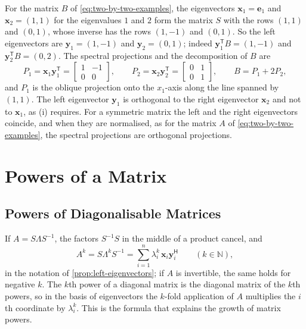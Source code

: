 For the matrix $B$ of \eqref{eq:two-by-two-examples}, the eigenvectors $\mathbf x_1=\mathbf e_1$ and $\mathbf x_2=(1,1)$ for the eigenvalues $1$ and $2$ form the matrix $S$ with the rows $(1,1)$ and $(0,1)$, whose inverse has the rows $(1,-1)$ and $(0,1)$. So the left eigenvectors are $\mathbf y_1=(1,-1)$ and $\mathbf y_2=(0,1)$; indeed $\mathbf y_1^{\mathsf T}B=(1,-1)$ and $\mathbf y_2^{\mathsf T}B=(0,2)$. The spectral projections and the decomposition of $B$ are
\[
P_1=\mathbf x_1\mathbf y_1^{\mathsf T}=\begin{bmatrix}1&-1\\0&0\end{bmatrix},\qquad P_2=\mathbf x_2\mathbf y_2^{\mathsf T}=\begin{bmatrix}0&1\\0&1\end{bmatrix},\qquad B=P_1+2P_2 ,
\]
and $P_1$ is the oblique projection onto the $x_1$-axis along the line spanned by $(1,1)$. The left eigenvector $\mathbf y_1$ is orthogonal to the right eigenvector $\mathbf x_2$ and not to $\mathbf x_1$, as (i) requires. For a symmetric matrix the left and the right eigenvectors coincide, and when they are normalised, as for the matrix $A$ of \eqref{eq:two-by-two-examples}, the spectral projections are orthogonal projections.

\section{Powers of a Matrix}
\label{sec:matrix-powers}

\subsection{Powers of Diagonalisable Matrices}

If $A=S\Lambda S^{-1}$, the factors $S^{-1}S$ in the middle of a product cancel, and
\[
A^k=S\Lambda^kS^{-1}=\sum_{i=1}^n\lambda_i^k\,\mathbf x_i\mathbf y_i^{\mathsf H}\qquad(k\in\mathbb N),
\]
in the notation of \cref{prop:left-eigenvectors}; if $A$ is invertible, the same holds for negative $k$. The $k$th power of a diagonal matrix is the diagonal matrix of the $k$th powers, so in the basis of eigenvectors the $k$-fold application of $A$ multiplies the $i$th coordinate by $\lambda_i^k$. This is the formula that explains the growth of matrix powers.

